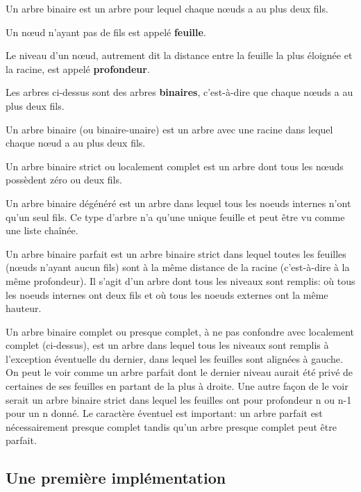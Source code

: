 \begin{defi}\cite{ref_03}

Un arbre binaire est un arbre pour lequel chaque n\oe{}uds a au plus deux fils.

Un n\oe{}ud n'ayant pas de fils est appelé \textbf{feuille}. 

Le niveau d'un nœud, autrement dit la distance entre la feuille la plus éloignée et la racine, est appelé \textbf{profondeur}.
\end{defi}


Les arbres ci-dessus sont des arbres \textbf{binaires}, c'est-à-dire que chaque n\oe{}uds a au plus deux fils. 


\begin{defi}
Un arbre binaire (ou binaire-unaire) est un arbre avec une racine dans lequel chaque nœud a au plus deux fils.

Un arbre binaire strict ou localement complet est un arbre dont tous les nœuds possèdent zéro ou deux fils.

Un arbre binaire dégénéré est un arbre dans lequel tous les noeuds internes n'ont qu'un seul fils. Ce type d'arbre n'a qu'une unique feuille et peut être vu comme une liste chaînée.

Un arbre binaire parfait est un arbre binaire strict dans lequel toutes les feuilles (nœuds n'ayant aucun fils) sont à la même distance de la racine (c'est-à-dire à la même profondeur). Il s'agit d'un arbre dont tous les niveaux sont remplis: où tous les noeuds internes ont deux fils et où tous les noeuds externes ont la même hauteur.

Un arbre binaire complet ou presque complet, à ne pas confondre avec localement complet (ci-dessus), est un arbre dans lequel tous les niveaux sont remplis à l'exception éventuelle du dernier, dans lequel les feuilles sont alignées à gauche. On peut le voir comme un arbre parfait dont le dernier niveau aurait été privé de certaines de ses feuilles en partant de la plus à droite. Une autre façon de le voir serait un arbre binaire strict dans lequel les feuilles ont pour profondeur n ou n-1 pour un n donné. Le caractère éventuel est important: un arbre parfait est nécessairement presque complet tandis qu'un arbre presque complet peut être parfait.
\end{defi}

\subsection{Une première implémentation}

